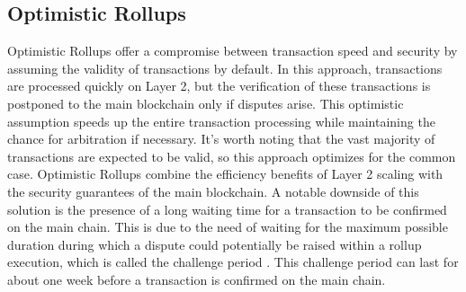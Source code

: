 \subsection{Optimistic Rollups \label{subsec:optimisticRollups}}
Optimistic Rollups offer a compromise between transaction speed and security by assuming the validity of transactions by default\cite{thibault_blockchain_2022}. In this approach, transactions are processed quickly on Layer 2, but the verification of these transactions is postponed to the main blockchain only if disputes arise. This optimistic assumption speeds up the entire transaction processing while maintaining the chance for arbitration if necessary. It's worth noting that the vast majority of transactions are expected to be valid, so this approach optimizes for the common case. Optimistic Rollups combine the efficiency benefits of Layer 2 scaling with the security guarantees of the main blockchain. A notable downside of this solution is the presence of a long waiting time for a transaction to be confirmed on the main chain. This is due to the need of waiting for the maximum possible duration during which a dispute could potentially be raised within a rollup execution, which is called the challenge period \cite{negka_blockchain_2021}. This challenge period can last for about one week before a transaction is confirmed on the main chain.


